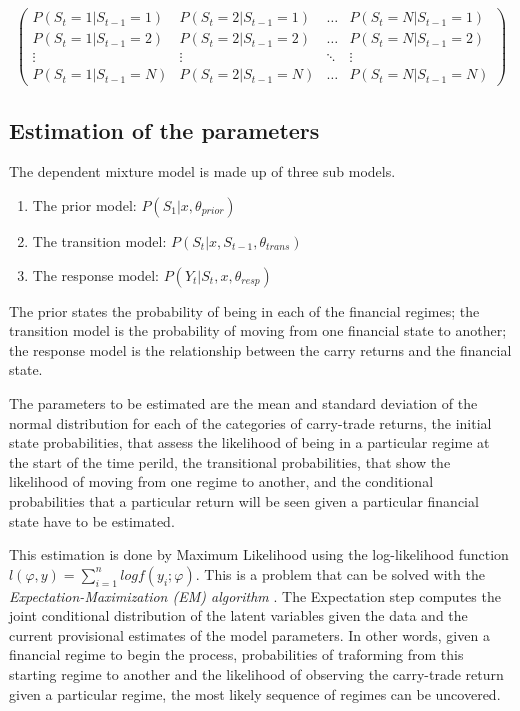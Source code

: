 \documentclass[12pt, a4paper, oneside]{article} %
\begin{document}
\begin{equation*}
\begin{pmatrix}
P(S_t = 1|S_{t-1}=1) & P(S_t = 2|S_{t-1}=1) & \dots & P(S_t = N|S_{t-1}=1)\\
P(S_t = 1|S_{t-1}=2) & P(S_t = 2|S_{t-1}=2) & \dots & P(S_t = N|S_{t-1}=2)\\
\vdots & \vdots & \ddots & \vdots \\
P(S_t = 1|S_{t-1}=N) & P(S_t = 2|S_{t-1}=N) & \dots & P(S_t = N|S_{t-1}=N)
\end{pmatrix}
\end{equation*}


\subsection{Estimation of the parameters}
The dependent mixture model is made up of three sub models.  

\begin{enumerate}
\item The prior model: $P(S_1|x, \theta_{prior})$
\item The transition model: $P(S_t|x, S_{t-1}, \theta_{trans})$
\item The response model: $P(Y_t| S_t, x, \theta_{resp})$
\end{enumerate}
 
The prior states the probability of being in each of the financial regimes; the transition model is the probability of moving from one financial state to another; the response model is the relationship between the carry returns and the financial state.  

The parameters to be estimated are the mean and standard deviation  of the normal distribution for each of the categories of carry-trade returns, the initial state probabilities, that assess the likelihood of being in a particular regime at the start of the time perild, the transitional probabilities, that show the likelihood of moving from one regime to another, and the conditional probabilities that a particular return will be seen given a particular financial state have to be estimated.  

This estimation is done by Maximum Likelihood using the log-likelihood function $l(\varphi, y) = \sum_{i=1}^n log f(y_i; \varphi)$. This is a problem that can be solved with the \emph{Expectation-Maximization (EM) algorithm} \citet{dempster1977maximum}. The Expectation step computes the joint conditional distribution of the latent variables given the data and the current provisional estimates of the model parameters. In other words, given a financial regime to begin the process, probabilities of traforming from this starting regime to another and the likelihood of observing the carry-trade return given a particular regime, the most likely sequence of regimes can be uncovered. 
\end{document}
